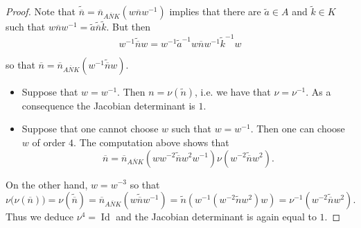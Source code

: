 \documentclass[AHL, Unicode, longabstracts, published]{cedram}
\DeclareMathOperator{\Id}{Id}
\newcommand{\til}{\widetilde}
\newcommand{\bn}{{\overline{n}}}
\newcommand{\bN}{{\overline{N}}}
\begin{document}
\begin{proof}
Note that $\til \bn=\bn_{A\bN K}(w\bn w^{-1}) $ implies that there are $\til a\in A$ and $\til k\in K$ such that $w\bn w^{-1}=\til a\til \bn\til k$. But then
\[
w^{-1}\til \bn w =w^{-1}\til a^{-1}w \bn w^{-1} \til k^{-1}w
\]

so that $\bn=\bn_{A\bN K}(w^{-1}\til \bn w)$.


\begin{itemize}
\item[Case 1] Suppose that $w=w^{-1}$. Then $n=\nu(\til n)$, i.e. we have that $\nu=\nu^{-1}$. As a consequence the Jacobian determinant is $1$.
\item[Case 2] Suppose that one cannot choose $w$ such that $w=w^{-1}$. Then one can choose $w$ of order $4$. The computation above shows that
\[
\bn=\bn_{A\bN K}\left(ww^{-2}\til \bn w^2 w^ {-1}\right) \nu\left(w^{-2}\til \bn w^2\right).
\]
\end{itemize}

On the other hand, $w=w^{-3}$ so that
\[
\nu\big(\nu(\bn)\big)=\nu\left(\til \bn\right)= \bn_{A\bN K}\left(w \til \bn w^{-1}\right)= \til n\left(w^{-1}\left(w^{-2}\til n w^2\right) w\right)= \nu^ {-1}\left(w^{-2}\til \bn w^2\right).
\]
Thus we deduce $\nu^4 =\Id$ and the Jacobian determinant is again equal to $1$.
\end{proof}\let\qed\relax


\end{document}
